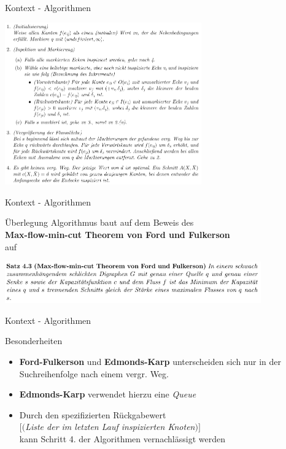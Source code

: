 \documentclass{beamer}
\begin{document}
    \begin{frame}{Kontext - Algorithmen}
        \begin{center}
            \includegraphics[height=7cm]{../algorithmus.PNG}
        \end{center}
    \end{frame}

    \begin{frame}{Kontext - Algorithmen}
        \begin{block}{\"Uberlegung}
            Algorithmus baut auf dem Beweis des\\ \textbf{Max-flow-min-cut Theorem von Ford und Fulkerson}\\ auf
        \end{block}

        \begin{center}
            \includegraphics[height=1.8cm]{../max-flow-min-cut.PNG}
        \end{center}
    \end{frame}

    \begin{frame}{Kontext - Algorithmen}
        \begin{block}{Besonderheiten}
            \begin{itemize}
                \item \textbf{Ford-Fulkerson} und \textbf{Edmonds-Karp} unterscheiden sich nur in der Suchreihenfolge nach einem vergr. Weg.
                \item \textbf{Edmonds-Karp} verwendet hierzu eine \textit{Queue}
                \item Durch den spezifizierten R\"uckgabewert\\
                $[($\textit{Liste der im letzten Lauf inspizierten Knoten}$)]$\\
                kann Schritt 4. der Algorithmen vernachl\"assigt werden
            \end{itemize}
        \end{block}
    \end{frame}
\end{document}
